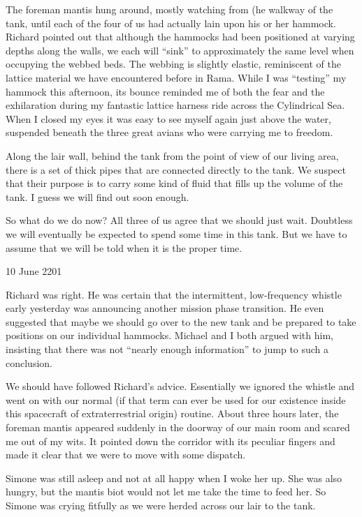 \documentclass[]{article}
\begin{document}
The foreman mantis hung around, mostly watching from (he walkway of the tank, until each of the four of us had actually lain upon his or her hammock. Richard pointed out that although the hammocks had been positioned at varying depths along the walls, we each will “sink” to approximately the same level when occupying the webbed beds. The webbing is slightly elastic, reminiscent of the lattice material we have encountered before in Rama. While I was “testing” my hammock this afternoon, its bounce reminded me of both the fear and the exhilaration during my fantastic lattice harness ride across the Cylindrical Sea. When I closed my eyes it was easy to see myself again just above the water, suspended beneath the three great avians who were carrying me to freedom.

Along the lair wall, behind the tank from the point of view of our living area, there is a set of thick pipes that are connected directly to the tank. We suspect that their purpose is to carry some kind of fluid that fills up the volume of the tank. I guess we will find out soon enough.

So what do we do now? All three of us agree that we should just wait. Doubtless we will eventually be expected to spend some time in this tank. But we have to assume that we will be told when it is the proper time.

10 June 2201

Richard was right. He was certain that the intermittent, low-frequency whistle early yesterday was announcing another mission phase transition. He even suggested that maybe we should go over to the new tank and be prepared to take positions on our individual hammocks. Michael and I both argued with him, insisting that there was not “nearly enough information” to jump to such a conclusion.

We should have followed Richard’s advice. Essentially we ignored the whistle and went on with our normal (if that term can ever be used for our existence inside this spacecraft of extraterrestrial origin) routine. About three hours later, the foreman mantis appeared suddenly in the doorway of our main room and scared me out of my wits. It pointed down the corridor with its peculiar fingers and made it clear that we were to move with some dispatch.

Simone was still asleep and not at all happy when I woke her up. She was also hungry, but the mantis biot would not let me take the time to feed her. So Simone was crying fitfully as we were herded across our lair to the tank.
\end{document}
